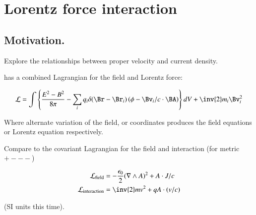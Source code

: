 
%
%



\chapter{Lorentz force interaction } %
\label{chap:lorentzTxEmPotential}
\date{ October 17, 2008.  $RCSfile: lorentzTxEmPotential.tex,v $ Last $Revision: 1.12 $ $Date: 2009/06/14 23:51:45 $ }

%


\section{Motivation.}

Explore the relationships between proper velocity and current density.

\citep{goldstein1951cm} has a combined Lagrangian for the field and Lorentz force:

\begin{align*}
\LL = \int \left\{ \frac{E^2 - B^2}{8 \pi} - \sum_i q_i \delta(\Br-\Br_i)\left(\phi - \Bv_i/c \cdot \BA\right)\right\} dV + \inv{2} m_i \Bv_i^2
\end{align*}

Where alternate variation of the field, or coordinates produces the field equations or Lorentz equation respectively.

Compare to the covariant Lagrangian for the field and interaction (for metric $+---$)

\begin{align}\label{eqn:lorentz_tx_em_potential:maxlag}
\LL_{\text{field}} &= -\frac{\epsilon_0}{2} (\grad \wedge A)^2 + A \cdot J/c \\
\LL_{\text{interaction}} &= \inv{2} m v^2 + q A \cdot (v/c)
\end{align}

(SI units this time).

